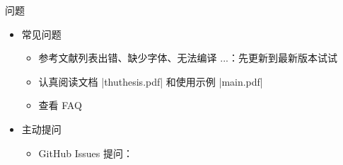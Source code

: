 \begin{frame}[fragile]{\ThuThesis 问题}
    \begin{itemize}
      \item 常见问题
        \begin{itemize}
          \item 参考文献列表出错、缺少字体、无法编译 ...：先更新到最新版本试试
          \item 认真阅读文档 |thuthesis.pdf| 和使用示例 |main.pdf|
          \item 查看 FAQ 
        \end{itemize}
      \item 主动提问
        \begin{itemize}
          \item GitHub Issues 提问：
        \end{itemize}
    \end{itemize}
\end{frame}



